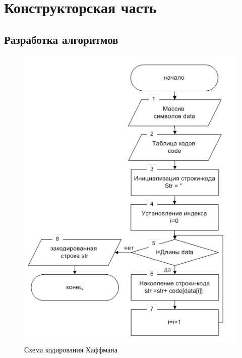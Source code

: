\chapter{Конструкторская часть}
\section{Разработка алгоритмов}

\begin{figure}[ht!]
	\centering
	\includegraphics[width=0.6\linewidth]{img/rsa.png}
	\caption{Схема кодирования Хаффмана}
	\label{img:rsa}
\end{figure}

